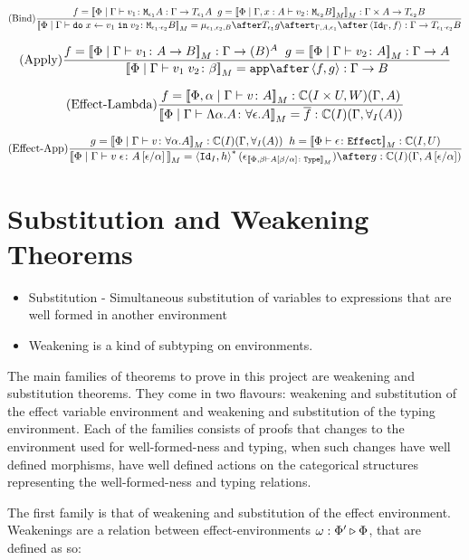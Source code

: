 \documentclass{Report}
\begin{document}
\[
    \treerule{Bind}{f = \deno{\etyperelation{\P}{\G}{v_1}{\M{\e_1}{A}} : \G \rightarrow \T{\e_1}{A}\s\s g = \deno{\etyperelation{\P}{\gax}{v_2}{\M{\e_2}{B}}}}: \G \times A \rightarrow \T{\e_2}{B}}{\deno{\etyperelation{\P}{\G}{\doin{x}{v_1}{v_2}}{\M{\e_1 \dot \e_2}{B}}} = \bind{\e_1}{\e_2}{B} \after \T{\e_1}{g} \after \tstrength{\G}{A}{\e_1} \after \pr{\idg}{f}: \G \rightarrow \T{\e_1 \dot \e_2}{B}}  
\]

\[
    \treerule{Apply}{f = \deno{\gpetyperelation{v_1}{\ab}}: \G \rightarrow (B)^{A} \s\s g=\deno{\gpetyperelation{v_2}{A}}: \G \rightarrow A}{\deno{\gpetyperelation{\apply{v_1}{v_2}}{\b}}= \app\after\pr{f}{g}: \G \rightarrow B }
\]

\[
    (\text{Effect-Lambda}) \frac{f = {\bf [\![}\Phi,\alpha\mid\Gamma \vdash v \colon A{\bf ]\!]}_M: \mathbb{C}(I\times U, W)(\Gamma, A)}{{\bf [\![}\Phi\mid\Gamma \vdash \Lambda \alpha. A \colon \forall \epsilon. A{\bf ]\!]}_M = \overline{f}: \mathbb{C}(I)(\Gamma, \forall_I(A))}    
\] 

\[
    \treerule{Effect-App}{g=\deno{\gpetyperelation{v}{\all{\a}{A}}}: \C(I)(\G, \allI(A))\s\s h = \deno{\typerelation{\P}{\e}{\effect}}: \ciu}{\deno{\gpetyperelation{\eapp{v}{\e}}{A\ssub{\a}{\e}}} = \pr{\Id{I}}{h}\star(\e_{\deno{\typerelation{\P,\b}{A\ssub{\a}{\b}}{\type}}})\after g: \C(I)(\G, A\ssub{\a}{\e})}
\]


\section{Substitution and Weakening Theorems}

\begin{itemize}
    \item Substitution - Simultaneous substitution of variables to expressions that are well formed in another environment
    \item Weakening is a kind of subtyping on environments.
\end{itemize}

The main families of theorems to prove in this project are weakening and substitution theorems. They come in two flavours: weakening and substitution of the effect variable environment and weakening and substitution of the typing environment. Each of the families consists of proofs that changes to the environment used for well-formed-ness and typing, when such changes have well defined morphisms, have well defined actions on the categorical structures representing the well-formed-ness and typing relations.

The first family is that of weakening and substitution of the effect environment. Weakenings are a relation between effect-environments $\omega : \Phi' \triangleright \Phi$, that are defined as so:
\end{document}
